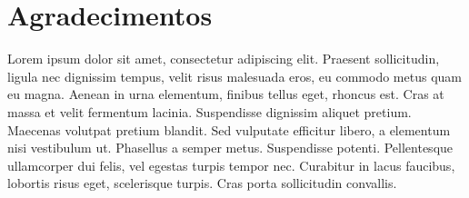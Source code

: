 \section{Agradecimentos}
\label{sec:agrad}

Lorem ipsum dolor sit amet, consectetur adipiscing elit. Praesent sollicitudin, ligula nec dignissim tempus, velit risus malesuada eros, eu commodo metus quam eu magna. Aenean in urna elementum, finibus tellus eget, rhoncus est. Cras at massa et velit fermentum lacinia. Suspendisse dignissim aliquet pretium. Maecenas volutpat pretium blandit. Sed vulputate efficitur libero, a elementum nisi vestibulum ut. Phasellus a semper metus. Suspendisse potenti. Pellentesque ullamcorper dui felis, vel egestas turpis tempor nec. Curabitur in lacus faucibus, lobortis risus eget, scelerisque turpis. Cras porta sollicitudin convallis.
